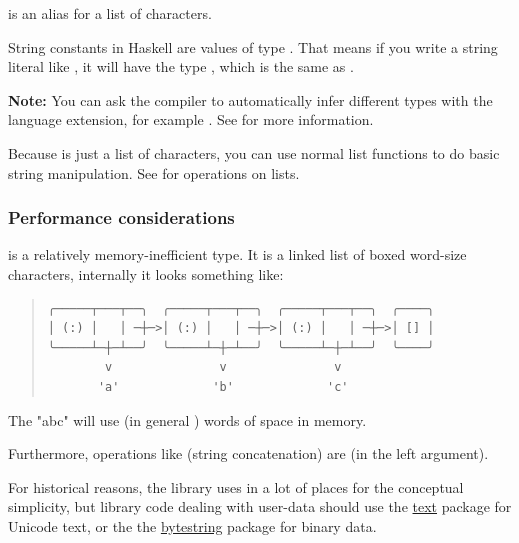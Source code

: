 \begin{haddockdesc}
\item[\begin{tabular}{@{}l}
type String = {\char 91}Char{\char 93}
\end{tabular}]
{\haddockbegindoc
{} is an alias for a list of characters.\par
String constants in Haskell are values of type .
 That means if you write a string literal like ,
 it will have the type , which is the same as .\par
\textbf{Note:} You can ask the compiler to automatically infer different types
 with the  language extension, for example
  . See  for more information.\par
Because  is just a list of characters, you can use normal list functions
 to do basic string manipulation. See  for operations on lists.\par
\subsubsection*{\textbf{Performance considerations}}
 is a relatively memory-inefficient type.
 It is a linked list of boxed word-size characters, internally it looks something like:\par
\begin{quote}
{\haddockverb\begin{verbatim}
╭─────┬───┬──╮  ╭─────┬───┬──╮  ╭─────┬───┬──╮  ╭────╮
│ (:) │   │ ─┼─>│ (:) │   │ ─┼─>│ (:) │   │ ─┼─>│ [] │
╰─────┴─┼─┴──╯  ╰─────┴─┼─┴──╯  ╰─────┴─┼─┴──╯  ╰────╯
        v               v               v
       'a'             'b'             'c'\end{verbatim}}
\end{quote}
The  "abc" will use  (in general )
 words of space in memory.\par
Furthermore, operations like \haddockid{(++)} (string concatenation) are 
 (in the left argument).\par
For historical reasons, the  library uses  in a lot of places
 for the conceptual simplicity, but library code dealing with user-data
 should use the \href{https://hackage.haskell.org/package/text}{text}
 package for Unicode text, or the the
 \href{https://hackage.haskell.org/package/bytestring}{bytestring} package
 for binary data.\par}
\end{haddockdesc}
